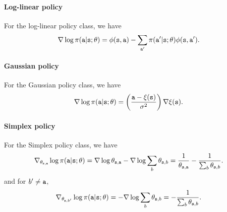 \paragraph{Log-linear policy}
For the log-linear policy class,  we have 
\[
\nabla \log \pi({\tt a}|{\tt s};\theta)= \phi({\tt s},{\tt a}) - \sum_{{\tt a}'}\pi({\tt a}'|{\tt s};\theta)\phi({\tt s},{\tt a}').
\]

\paragraph{Gaussian policy} For the Gaussian policy class, we have \[
\nabla \log
\pi({\tt a}|{\tt s};\theta) = 
\left(\frac{{\tt a}-\xi({\tt s})}{\sigma^2}\right) \nabla \xi({\tt s}).
\]

\paragraph{Simplex policy} For the Simplex policy class, we have 
\[
\nabla_{\theta_{{\tt s},{\tt a}}} \log
\pi({\tt a}|{\tt s};\theta) = \nabla \log \theta_{{\tt s},{\tt a}} - \nabla\log \sum_b \theta_{{\tt s},b}=
\frac{1}{\theta_{{\tt s},{\tt a}}}-\frac{1}{\sum_b \theta_{{\tt s},b}}.
\]
and for $b'\neq {\tt a}$,
\[
\nabla_{\theta_{{\tt s},b'}} \log
\pi({\tt a}|{\tt s};\theta) =  - \nabla\log \sum_b \theta_{{\tt s},b}=
-\frac{1}{\sum_b \theta_{{\tt s},b}}.
\]




